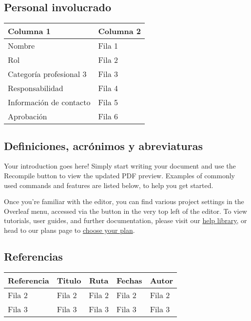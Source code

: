 \documentclass {article}
\begin{document}
\subsection{Personal involucrado}
\begin{tabularx}{\textwidth}{|>{\hsize=0.5\hsize}X|>{\hsize=1.5\hsize}X|}
\hline
 Columna 1 & Columna 2 \\
 \hline
 Nombre & Fila 1 \\
 \hline
 Rol & Fila 2 \\
 \hline
 Categoría profesional 3 & Fila 3 \\
 \hline
 Responsabilidad & Fila 4 \\
 \hline
 Información de contacto & Fila 5 \\
 \hline
 Aprobación & Fila 6 \\
 \hline
\end{tabularx}

\subsection{Definiciones, acrónimos y abreviaturas}
Your introduction goes here! Simply start writing your document and use the Recompile button to view the updated PDF preview. Examples of commonly used commands and features are listed below, to help you get started.

Once you're familiar with the editor, you can find various project settings in the Overleaf menu, accessed via the button in the very top left of the editor. To view tutorials, user guides, and further documentation, please visit our \href{https://www.overleaf.com/learn}{help library}, or head to our plans page to \href{https://www.overleaf.com/user/subscription/plans}{choose your plan}.
\subsection{Referencias}

\begin{tabularx}{\textwidth}{|X|X|X|X|X|}
\hline
\multicolumn{1}{|c|}{Referencia} & \multicolumn{1}{c|}{Titulo} & \multicolumn{1}{c|}{Ruta} & \multicolumn{1}{c|}{Fechas} & \multicolumn{1}{c|}{Autor} \\
\hline
\multicolumn{1}{|l|}{Fila 2} & \multicolumn{1}{l|}{Fila 2} & \multicolumn{1}{l|}{Fila 2} & \multicolumn{1}{l|}{Fila 2} & \multicolumn{1}{l|}{Fila 2} \\
\hline
\multicolumn{1}{|l|}{Fila 3} & \multicolumn{1}{l|}{Fila 3} & \multicolumn{1}{l|}{Fila 3} & \multicolumn{1}{l|}{Fila 3} & \multicolumn{1}{l|}{Fila 3} \\
\hline
\end{tabularx}
\end{document}
